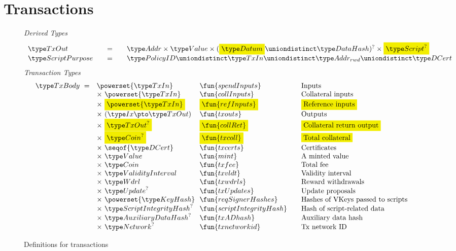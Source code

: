 \section{Transactions}
\label{sec:transactions}
\begin{figure*}[htb]
  \emph{Derived Types}
  \begin{equation*}
    \begin{array}{l@{\qquad=\qquad}lr}
      \TxOut & \Addr \times \Value \times (\hldiff{\Datum} \uniondistinct \DataHash)^? \times \hldiff{\Script^?} \\
      \ScriptPurpose & \PolicyID \uniondistinct \TxIn \uniondistinct \AddrRWD \uniondistinct \DCert
    \end{array}
  \end{equation*}
  \emph{Transaction Types}
  \begin{equation*}
    \begin{array}{r@{~~}l@{~~}l@{\qquad}l}
      \TxBody ~=~
      & \powerset{\TxIn} & \fun{spendInputs}& \text{Inputs}\\
      & \times ~\powerset{\TxIn} & \fun{collInputs} & \text{Collateral inputs}\\
      & \times ~\hldiff{\powerset{\TxIn}} & \hldiff{\fun{refInputs}} & \hldiff{\text{Reference inputs}}\\
      & \times ~(\Ix \pto \TxOut) & \fun{txouts}& \text{Outputs}\\
      & \times ~\hldiff{\TxOut^?} & \hldiff{\fun{collRet}} & \hldiff{\text{Collateral return output}}\\
      & \times ~\hldiff{\Coin^?} & \hldiff{\fun{txcoll}} & \hldiff{\text{Total collateral}}\\
      & \times~ \seqof{\DCert} & \fun{txcerts}& \text{Certificates}\\
       & \times ~\Value  & \fun{mint} &\text{A minted value}\\
       & \times ~\Coin & \fun{txfee} &\text{Total fee}\\
       & \times ~\ValidityInterval & \fun{txvldt} & \text{Validity interval}\\
       & \times~ \Wdrl  & \fun{txwdrls} &\text{Reward withdrawals}\\
       & \times ~\Update^?  & \fun{txUpdates} & \text{Update proposals}\\
       & \times ~\powerset{\KeyHash} & \fun{reqSignerHashes} & \text{Hashes of VKeys passed to scripts}\\
       & \times ~\ScriptIntegrityHash^? & \fun{scriptIntegrityHash} & \text{Hash of script-related data}\\
       & \times ~\AuxiliaryDataHash^? & \fun{txADhash} & \text{Auxiliary data hash}\\
       & \times ~\Network^? & \fun{txnetworkid} & \text{Tx network ID}\\
    \end{array}
  \end{equation*}
  \caption{Definitions for transactions}
  \label{fig:defs:utxo-shelley-2}
\end{figure*}

